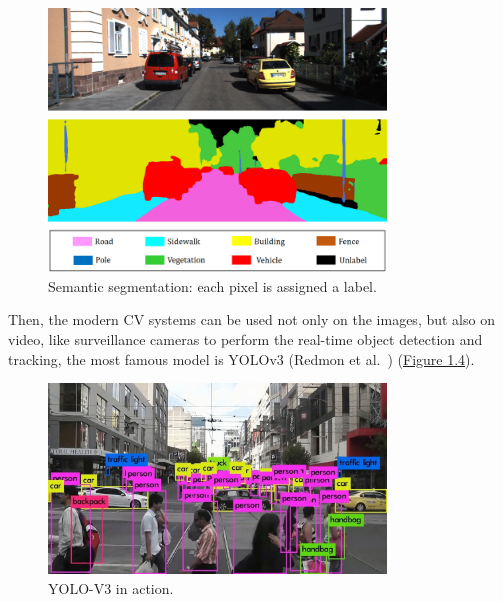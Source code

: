 \begin{figure}[H]
    \centering
    \includegraphics[width=0.8\textwidth]{images/1_1_semantic_segmentation}
    \caption[Example of semantic segmentation]{Semantic segmentation: each pixel is assigned a label.}
    \label{fig:figure-semantic-segmentation}
\end{figure}

Then, the modern CV systems can be used not only on the images, but also on video, like surveillance cameras to perform the real-time object detection and tracking, the most famous model is YOLOv3 (Redmon et al.~\cite{yolov3_paper}) (\hyperref[fig:figure-yolo-v3]{Figure 1.4}).

\begin{figure}[H]
    \centering
    \includegraphics[width=0.8\textwidth]{images/1_1_yolov3}
    \caption{YOLO-V3 in action.}
    \label{fig:figure-yolo-v3}
\end{figure}

